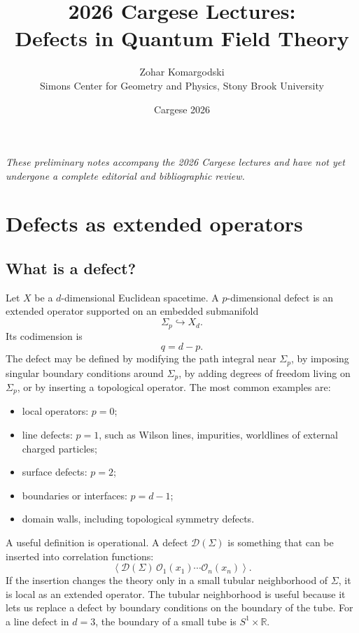 \documentclass[11pt]{article}
\title{2026 Cargese Lectures:\\ Defects in Quantum Field Theory}
\author{Zohar Komargodski\\
\small Simons Center for Geometry and Physics, Stony Brook University}
\date{Cargese 2026}
\newcommand{\R}{\mathbb{R}}
\newcommand{\cD}{\mathcal{D}}
\newcommand{\cO}{\mathcal{O}}
\newcommand{\vev}[1]{\left\langle #1\right\rangle}
\begin{document}
\maketitle

\begin{center}
\begin{minipage}{0.82\textwidth}
\small\itshape
These preliminary notes accompany the 2026 Cargese lectures and have not yet
undergone a complete editorial and bibliographic review.
\end{minipage}
\end{center}

\medskip

\tableofcontents
\newpage


\section{Defects as extended operators}

\subsection{What is a defect?}

Let $X$ be a $d$-dimensional Euclidean spacetime.  A $p$-dimensional defect is an extended operator supported on an embedded submanifold
\begin{equation}
  \Sigma_p \hookrightarrow X_d .
\end{equation}
Its codimension is
\begin{equation}
  q=d-p .
\end{equation}
The defect may be defined by modifying the path integral near $\Sigma_p$, by imposing singular boundary conditions around $\Sigma_p$, by adding degrees of freedom living on $\Sigma_p$, or by inserting a topological operator.  The most common examples are:
\begin{itemize}
  \item local operators: $p=0$;
  \item line defects: $p=1$, such as Wilson lines, impurities, worldlines of external charged particles;
  \item surface defects: $p=2$;
  \item boundaries or interfaces: $p=d-1$;
  \item domain walls, including topological symmetry defects.
\end{itemize}

A useful definition is operational.  A defect $\cD(\Sigma)$ is something that can be inserted into correlation functions:
\begin{equation}
  \vev{\cD(\Sigma)\, \cO_1(x_1)\cdots \cO_n(x_n)} .
\end{equation}
If the insertion changes the theory only in a small tubular neighborhood of $\Sigma$, it is local as an extended operator.  The tubular neighborhood is useful because it lets us replace a defect by boundary conditions on the boundary of the tube.  For a line defect in $d=3$, the boundary of a small tube is $S^1\times \R$.
\end{document}
